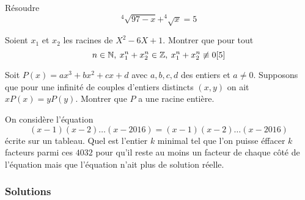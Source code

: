 \begin{exo}[M-D]
Résoudre $$^4\sqrt{97-x}+^4\sqrt{x}=5$$

\end{exo}

\begin{exo}[M]
Soient $x_1$ et $x_2$ les racines de $X^2-6X+1$. Montrer que pour tout $$n\in \mathbb N,\: x_1^n+x_2^n\in \mathbb Z, \: x_1^n+x_2^n\not\equiv 0[5 ] $$

\end{exo}



\begin{exo}[SL IMO 2002, A3, D]
Soit $P(x)=ax^3+bx^2+cx+d$ avec $a,b,c,d$ des entiers et $a\ne 0$. Supposons que pour une infinité de couples d'entiers distincts $(x,y)$ on ait $xP(x)=yP(y)$. Montrer que $P$ a une racine entière.
\end{exo}

\begin{exo}[IMO 2016 P5]
On considère l'équation 
$$(x-1)(x-2)\dots(x-2016)=(x-1)(x-2)\dots(x-2016) $$
écrite sur un tableau. Quel est l'entier $k$ minimal tel que l'on puisse éffacer $k$ facteurs parmi ces $4032$ pour qu'il reste au moins un facteur de chaque côté de l'équation mais que l'équation n'ait plus de solution réelle.
\end{exo}



\subsubsection{Solutions}

